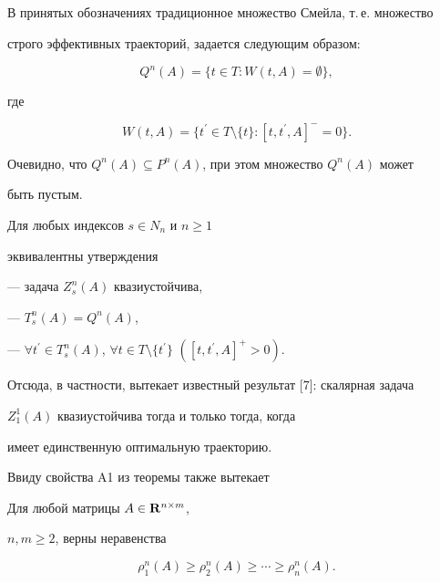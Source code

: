 В принятых обозначениях традиционное множество Смейла, т.\,е. множество


строго эффективных траекторий, задается следующим образом:


$$


Q^n(A)=\{t\in T : W(t,A)=\emptyset\},


$$


где


$$


W(t,A)=\{t^{\prime}\in T\setminus \{t\} : [t,t^{\prime},A]^-=0\}.


$$


Очевидно, что $Q^n(A)\subseteq P^n(A)$, при этом множество $Q^n(A)$ может


быть пустым.





\begin{cor}


Для любых индексов $s \in N_n$ и $n\geq 1$


эквивалентны утверждения





--- задача $Z^n_s(A)$ квазиустойчива,





--- $T^n_s(A)=Q^n(A)$,





--- $\forall t^{\prime}\in T^n_s(A)$, $\forall t\in


T\setminus \{t^{\prime}\}$ $([t,t^{\prime},A]^+>0)$.


\end{cor}





Отсюда, в частности, вытекает известный результат [7]: скалярная задача


$Z^1_1(A)$ квазиустойчива тогда и только тогда, когда


имеет единственную оптимальную траекторию.





Ввиду свойства A1 из теоремы также вытекает





\begin{cor}


Для любой матрицы $A\in \bold{R}^{n\times m}$,


$n, m \geq 2$, верны неравенства


$$


\rho^n_1(A)\geq \rho^n_2(A)\geq \dotsb\geq \rho^n_n(A).


$$


\end{cor}






